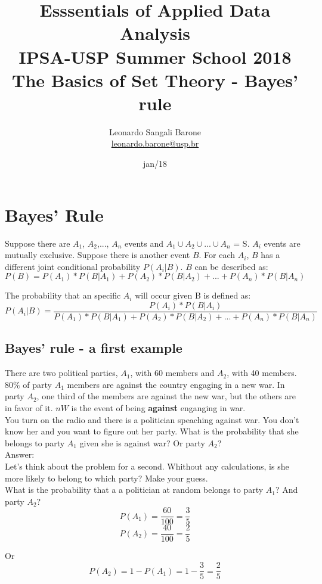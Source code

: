 \documentclass[11pt]{article}
\title{\textbf{Esssentials of Applied Data Analysis\\
				IPSA-USP Summer School 2018}\newline\\
				The Basics of Set Theory - Bayes' rule}
\author{Leonardo Sangali Barone\\ \href{leonardo.barone@usp.br}{leonardo.barone@usp.br}}
\date{jan/18}
\begin{document}
\maketitle

\section*{Bayes' Rule}

	Suppose there are $A_1$, $A_2$,..., $A_n$ events and $A_1 \cup A_2 \cup... \cup A_n$ = S. $A_i$ events are mutually exclusive. Suppose there is another event $B$. For each $A_i$, $B$ has a different joint conditional probability $P(A_i|B)$. $B$ can be described as:
	\[P(B) = P(A_1)*P(B|A_1)+P(A_2)*P(B|A_2)+...+P(A_n)*P(B|A_n)\]
 
	The probability that an specific $A_i$ will occur given B is defined as:
	\[P(A_i|B) = \frac{P(A_i)*P(B|A_i)}{P(A_1)*P(B|A_1)+P(A_2)*P(B|A_2)+...+P(A_n)*P(B|A_n)}\]
		
	\subsection*{Bayes' rule - a first example}
	
	There are two political parties, $A_1$, with 60 members and $A_2$, with 40 members. $80\%$ of party $A_1$ members are against the country engaging in a new war. In party $A_2$, one third of the members are against the new war, but the others are in favor of it. $nW$ is the event of being \textbf{against} enganging in war.\\

	You turn on the radio and there is a politician speaching against war. You don't know her and you want to figure out her party. What is the probability that she belongs to party $A_1$ given she is against war? Or party $A_2$?\\
	
	Answer:\\
	
	Let's think about the problem for a second. Whithout any calculations, is she more likely to belong to which party? Make your guess.\\
	
	What is the probability that a a politician at random belongs to party $A_1$? And party $A_2$?
	\[P(A_1) = \frac{60}{100} = \frac{3}{5} \]
	\[P(A_2) = \frac{40}{100} = \frac{2}{5} \]
	
Or
	\[P(A_2) = 1 - P(A_1) = 1 - \frac{3}{5} = \frac{2}{5}\]
	
\end{document}
